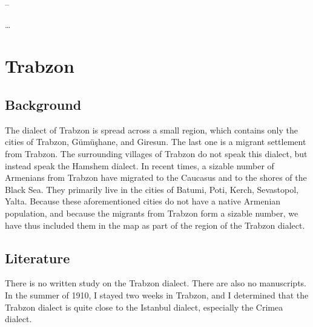 – 

… 



\chapter{Trabzon} \label{chapter:Trabzon}
\section{Background}
\begin{adjarianpage}\label{page:178}\end{adjarianpage}%

The dialect of Trabzon is spread across a small region, which contains only the cities of Trabzon, Gümüşhane, and Giresun. The last one is a migrant settlement from Trabzon. The surrounding villages of Trabzon do not speak this dialect, but instead speak the Hamshem dialect. In recent times, a sizable number of Armenians from Trabzon have migrated to the Caucasus and to the shores of the Black Sea. They primarily live in the cities of Batumi, Poti, Kerch, Sevastopol, Yalta. Because these aforementioned cities do not have a native Armenian population, and because the migrants from Trabzon form a sizable number, we have thus included them in the map as part of the region of the Trabzon dialect. 

\section{Literature}
\sloppy
There is no written study on the Trabzon dialect. There are also no manuscripts. In the summer of 1910, I stayed two weeks in Trabzon, and I determined that the Trabzon dialect is quite close to the Istanbul dialect, especially the Crimea dialect.
\fussy

